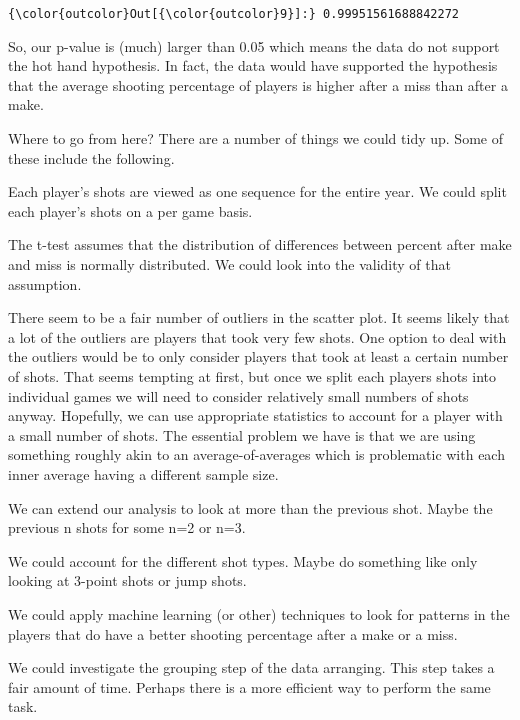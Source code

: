 \documentclass{article}
\begin{document}
            \begin{Verbatim}[commandchars=\\\{\}]
{\color{outcolor}Out[{\color{outcolor}9}]:} 0.99951561688842272
\end{Verbatim}
        
    So, our p-value is (much) larger than 0.05 which means the data do not
support the hot hand hypothesis. In fact, the data would have supported
the hypothesis that the average shooting percentage of players is higher
after a miss than after a make.

Where to go from here? There are a number of things we could tidy up.
Some of these include the following.

Each player's shots are viewed as one sequence for the entire year. We
could split each player's shots on a per game basis.

The t-test assumes that the distribution of differences between percent
after make and miss is normally distributed. We could look into the
validity of that assumption.

There seem to be a fair number of outliers in the scatter plot. It seems
likely that a lot of the outliers are players that took very few shots.
One option to deal with the outliers would be to only consider players
that took at least a certain number of shots. That seems tempting at
first, but once we split each players shots into individual games we
will need to consider relatively small numbers of shots anyway.
Hopefully, we can use appropriate statistics to account for a player
with a small number of shots. The essential problem we have is that we
are using something roughly akin to an average-of-averages which is
problematic with each inner average having a different sample size.

We can extend our analysis to look at more than the previous shot. Maybe
the previous n shots for some n=2 or n=3.

We could account for the different shot types. Maybe do something like
only looking at 3-point shots or jump shots.

We could apply machine learning (or other) techniques to look for
patterns in the players that do have a better shooting percentage after
a make or a miss.

We could investigate the grouping step of the data arranging. This step
takes a fair amount of time. Perhaps there is a more efficient way to
perform the same task.


    
    
    
    
\end{document}
